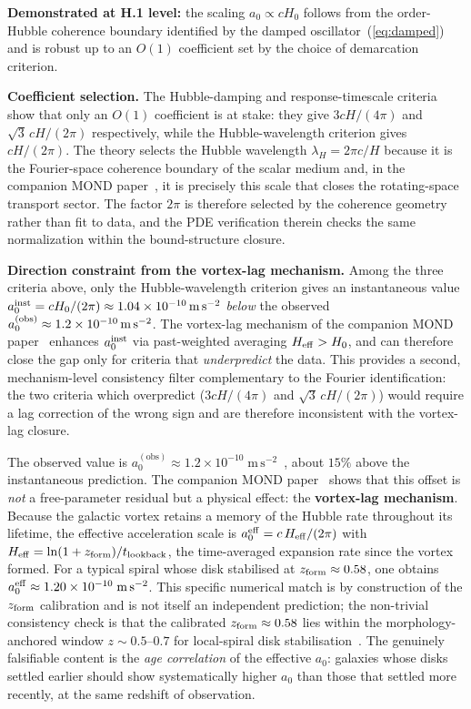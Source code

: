 \documentclass[aps,prd,onecolumn,superscriptaddress,nofootinbib,showpacs,12pt]{revtex4-2}
\newcommand{\azero}{a_{0}}
\begin{document}
\textbf{Demonstrated at H.1 level:} the scaling
$\azero \propto cH_{0}$ follows from the
order-Hubble coherence boundary identified by the damped
oscillator~(\ref{eq:damped}) and is robust up to an
$O(1)$ coefficient set by the choice of demarcation
criterion.

\textbf{Coefficient selection.} The Hubble-damping and
response-timescale criteria show that only an $O(1)$
coefficient is at stake: they give $3cH/(4\pi)$ and
$\sqrt{3}\,cH/(2\pi)$ respectively, while the
Hubble-wavelength criterion gives $cH/(2\pi)$.
The theory selects the Hubble wavelength
$\lambda_{H} = 2\pi c/H$ because it is the
Fourier-space coherence boundary of the scalar medium and,
in the companion MOND paper~\cite{Lotishvili2026MOND}, it is precisely this scale that closes the
rotating-space transport sector.  The factor $2\pi$ is
therefore selected by the coherence geometry rather than fit
to data, and the PDE verification therein checks the same
normalization within the bound-structure closure.

\textbf{Direction constraint from the vortex-lag
mechanism.}  Among the three criteria above, only the
Hubble-wavelength criterion gives an instantaneous value
$\azero^{\rm inst} = cH_{0}/(2\pi) \approx
1.04\times10^{-10}\,\mathrm{m\,s^{-2}}$
\emph{below} the observed
$\azero^{(\rm obs)} \approx 1.2\times10^{-10}\,
\mathrm{m\,s^{-2}}$.  The vortex-lag mechanism of the
companion MOND paper~\cite{Lotishvili2026MOND}
enhances $\azero^{\rm inst}$
via past-weighted averaging $H_{\rm eff} > H_{0}$, and
can therefore close the gap only for criteria that
\emph{underpredict} the data.  This provides a second,
mechanism-level consistency filter complementary to the
Fourier identification: the two criteria which
overpredict ($3cH/(4\pi)$ and $\sqrt{3}\,cH/(2\pi)$)
would require a lag correction of the wrong sign and
are therefore inconsistent with the vortex-lag closure.

The observed value is
$\azero^{(\mathrm{obs})} \approx 1.2 \times
10^{-10}\;\mathrm{m\,s^{-2}}$~\cite{McGaugh2016},
about $15\%$ above the instantaneous prediction.
The companion MOND paper~\cite{Lotishvili2026MOND}
shows that this offset is \emph{not} a free-parameter
residual but a physical effect: the \textbf{vortex-lag
mechanism}.  Because the galactic vortex retains a
memory of the Hubble rate throughout its lifetime, the
effective acceleration scale is
$\azero^{\rm eff}=c\,H_{\rm eff}/(2\pi)$ with
$H_{\rm eff}=\ln(1+z_{\rm form})/t_{\rm lookback}$,
the time-averaged expansion rate since the vortex
formed.  For a typical spiral whose disk stabilised at
$z_{\rm form}\approx 0.58$, one obtains
$\azero^{\rm eff}\approx
1.20\times10^{-10}\;\mathrm{m\,s^{-2}}$.  This specific
numerical match is by construction of the $z_{\rm form}$
calibration and is not itself an independent prediction;
the non-trivial consistency check is that the calibrated
$z_{\rm form}\approx 0.58$ lies within the
morphology-anchored window $z\sim 0.5$--$0.7$ for
local-spiral disk
stabilisation~\cite{Hopkins2010,Stewart2008}.
The genuinely falsifiable content is the \emph{age
correlation} of the effective $\azero$: galaxies whose
disks settled earlier should show systematically higher
$\azero$ than those that settled more recently, at the
same redshift of observation.
\end{document}
